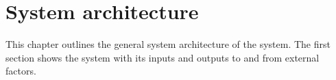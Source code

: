 \chapter{System architecture}
This chapter outlines the general system architecture of the system. The first section shows the system with its inputs and outputs to and from external factors.

\label{ch:system}





